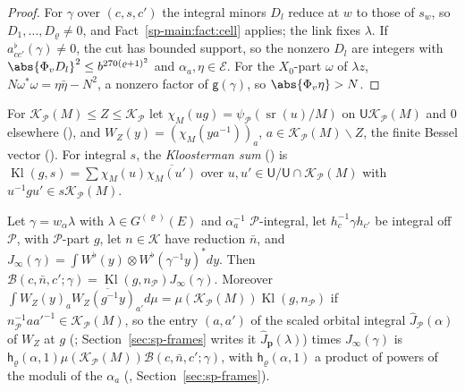 \begin{proof}
For $\gamma$ over $(c,s,c')$ the integral minors $D_l$ reduce at $w$ to those of $s_w$, so
$D_1,\dots,D_\varrho\ne0$, and Fact~\ref{sp-main:fact:cell} applies; the link fixes $\lambda$. If $a^\flat_{cc'}(\gamma)\ne0$, the cut has bounded support, so the nonzero
$D_l$ are integers with $\abs{\Phi_vD_l}^2\le b^{270(\varrho+1)^2}$ and $\alpha_a,\eta\in\mathcal E$. For the
$X_0$-part $\omega$ of $\lambda z$, $N\omega^*\omega=\eta\bar\eta-N^2$, a nonzero factor of
$\mathsf g(\gamma)$, so $\abs{\Phi_v\eta}>N$.
\end{proof}

For $\mathcal K_{\mathcal P}(M)\le Z\le\mathcal K_{\mathcal P}$ let $\chi_M(ug)=\psi_{\mathcal P}(\operatorname{sr}(u)/M)$ on
$\mathsf U\mathcal K_{\mathcal P}(M)$ and $0$ elsewhere (),
and $W_Z(y)=(\chi_M(ya^{-1}))_a$, $a\in\mathcal K_{\mathcal P}(M)\backslash Z$, the finite Bessel vector
(). For
integral $s$, the \emph{Kloosterman sum} () is
$\operatorname{Kl}(g,s)=\sum\chi_M(u)\overline{\chi_M(u')}$ over $u,u'\in\mathsf U/\mathsf U\cap\mathcal
K_{\mathcal P}(M)$ with $u^{-1}gu'\in s\mathcal K_{\mathcal P}(M)$.

\begin{proposition}[Unfolding]\label{sp-main:prop:kloosterman}
Let $\gamma=w_\alpha\lambda$ with $\lambda\in G^{(\varrho)}(E)$ and $\alpha_a^{-1}$ $\mathcal P$-integral,
let $h_c^{-1}\gamma h_{c'}$ be integral off $\mathcal P$, with $\mathcal P$-part $g$, let $n\in\mathcal K$ have
reduction $\bar n$, and $J_\infty(\gamma)=\int W^\flat(y)\otimes W^\flat(\gamma^{-1}y)^*dy$. Then
$\mathcal B(c,\bar n,c';\gamma)=\operatorname{Kl}(g,n_{\mathcal P})J_\infty(\gamma)$. Moreover
$\int W_Z(y)_a\overline{W_Z(g^{-1}y)_{a'}}d\mu=\mu(\mathcal K_{\mathcal P}(M))\operatorname{Kl}(g,n_{\mathcal P})$ if
$n_{\mathcal P}^{-1}aa'^{-1}\in\mathcal K_{\mathcal P}(M)$, so the entry $(a,a')$ of the scaled orbital integral $\hat J_{\mathcal P}(\alpha)$ of $W_Z$ at $g$
(; Section~\ref{sec:sp-frames} writes it
$\hat J_{\mathbf p}(\lambda)$) times $J_\infty(\gamma)$ is $\mathsf h_\varrho(\alpha,1)\mu(\mathcal K_{\mathcal P}(M))
\mathcal B(c,\bar n,c';\gamma)$, with $\mathsf h_\varrho(\alpha,1)$ a product of powers of the moduli of the
$\alpha_a$ (, Section~\ref{sec:sp-frames}).
\end{proposition}

